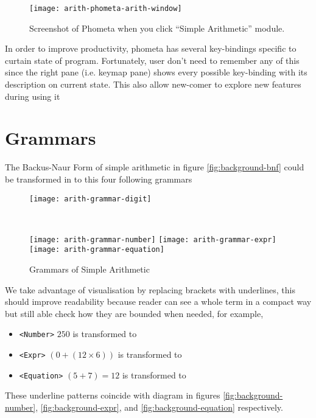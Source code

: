 \documentclass[master.tex]{subfiles}
\begin{document}
\begin{figure}[H]
    \centering
    \texttt{[image: arith-phometa-arith-window]}
    \caption{Screenshot of Phometa when you click ``Simple Arithmetic'' module.}
\label{fig:arith-phometa-arith-window}
\end{figure}

In order to improve productivity, phometa has several key-bindings specific to
curtain state of program. Fortunately, user don't need to remember any of this
since the right pane (i.e. keymap pane) shows every possible key-binding with
its description on current state. This also allow new-comer to explore new
features during using it

\section{Grammars}

The Backus-Naur Form of simple arithmetic in figure \ref{fig:background-bnf}
could be transformed in to this four following grammars
\begin{figure}[H]
    \centering
\begin{minipage}{0.48\textwidth}
\begin{flushleft}
    \texttt{[image: arith-grammar-digit]}
\end{flushleft}
\end{minipage}
~
\begin{minipage}{0.48\textwidth}
\begin{flushright}
    \texttt{[image: arith-grammar-number]}
    \texttt{[image: arith-grammar-expr]}
    \texttt{[image: arith-grammar-equation]}
\end{flushright}
\end{minipage}
    \caption{Grammars of Simple Arithmetic}
\label{fig:arith-grammars}
\end{figure}

We take advantage of visualisation by replacing brackets with underlines, this
should improve readability because reader can see a whole term in a compact
way but still able check how they are bounded when needed, for example,
\begin{itemize}
\item \texttt{<Number>} $250$ is transformed to
   
\item \texttt{<Expr>} $(0 + (12 \times 6))$ is transformed to
   
\item \texttt{<Equation>} $(5 + 7) = 12$ is transformed to
   
\end{itemize}
These underline patterns coincide with diagram in figures
\ref{fig:background-number}, \ref{fig:background-expr}, and
\ref{fig:background-equation} respectively.
\end{document}
